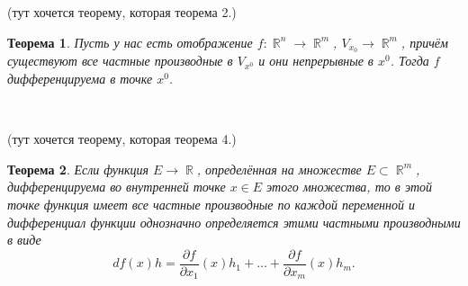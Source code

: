 \documentclass[a4paper,100pt]{article}
\theoremstyle{indented}
\newtheorem{theorem}{Теорема}
\theoremstyle{definition}
\theoremstyle{remark}
\DeclareMathOperator{\RR}{\mathbb{R}}
\begin{document}
(тут хочется теорему, которая теорема 2.) \\

\begin{theorem}
    Пусть у нас есть отображение $f:\RR^n\rightarrow \RR^m$, $V_{x_0}\rightarrow \RR^m$, причём существуют все частные производные в $V_{x^0}$ и они непрерывные в $x^0$. Тогда $f$ дифференцируема в точке $x^0$. 
\end{theorem} \ 

(тут хочется теорему, которая теорема 4.) \\

\begin{theorem}
    Если функция $E\rightarrow \RR$, определённая на множестве $E\subset \RR^m$, дифференцируема во внутренней точке $x\in E$ этого множества, то в этой точке функция имеет все частные производные по каждой переменной и дифференциал функции однозначно определяется этими частными производными в виде
    \[
      df(x)h=\frac{\partial f}{\partial x_1}(x)h_1+\ldots+\frac{\partial f}{\partial x_m}(x)h_m. 
    \]
  \end{theorem}
\end{document}
